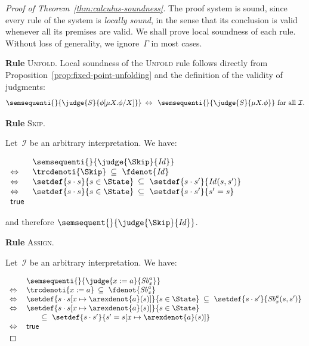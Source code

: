 \documentclass[a4paper,numberwithinsect]{lipics-v2021}
\begin{document}
\begin{proof}[Proof of Theorem~\ref{thm:calculus-soundness}]
  The proof system is sound, since every rule of the system is
  \emph{locally sound}, in the sense that its conclusion is valid
  whenever all its premises are valid.
  We shall prove local soundness of each rule.
  Without loss of generality, we ignore~$\Gamma$ in most cases.

  \iffalse
  \noindent\textbf{Rule} \textsc{Unfold}.
  Local soundness of the \textsc{Unfold} rule follows directly from
  Proposition~\ref{prop:fixed-point-unfolding} and the definition of
  the validity of judgments:
  \[
    \semsequenti{}{\judge{S}{\phi [\mu X. \phi / X]}}
    \>\Leftrightarrow\>\>
    \semsequenti{}{\judge{S}{\mu X. \phi}}\text{ for all }\mathcal{I}.
  \]

  \noindent\textbf{Rule} \textsc{Skip}.

  Let~$\mathcal{I}$ be an arbitrary interpretation.
  We have: %
  
  $
  \begin{array}{ll}
    & 
      \semsequenti{}{\judge{\Skip}{\mathit{Id}}} \\
    \Leftrightarrow\> & 
                        \trcdenoti{\Skip} \>\subseteq\
                        \fdenot{\mathit{Id}} \\
    \Leftrightarrow & 
                      \setdef{s \cdot s}{s \in \State} \>\subseteq\ 
                      \setdef{s \cdot s'}{\mathit{Id} (s, s')} \\
    \Leftrightarrow & 
                      \setdef{s \cdot s}{s \in \State} \>\subseteq\ 
                      \setdef{s \cdot s'}{s' = s} \\
    \mathsf{true}
  \end{array}
  $ 
  
  \noindent
  and therefore $ \semsequent{}{\judge{\Skip}{\mathit{Id}}} $.
  
  \noindent\textbf{Rule} \textsc{Assign}.
  
  Let~$\mathcal{I}$ be an arbitrary interpretation.
  We have: %

  $
  \begin{array}{ll}
    & 
      \semsequenti{}{\judge{x := a}{\mathit{Sb}^{a}_{x}}} \\
    \Leftrightarrow\> & 
                        \trcdenoti{x := a} \>\subseteq\
                        \fdenot{\mathit{Sb}^{a}_{x}} \\
    \Leftrightarrow & 
                      \setdef{s \cdot s[x \mapsto \arexdenot{a} (s)]}
                      {s \in \State} 
                      \>\subseteq\ 
                      \setdef{s \cdot s'}{\mathit{Sb}^{a}_{x} (s, s')} \\
    \Leftrightarrow & 
                      \setdef{s \cdot s[x \mapsto \arexdenot{a} (s)]}{s \in \State} \\
    & \qquad\subseteq\ 
      \setdef{s \cdot s'}{s' = s[x \mapsto \arexdenot{a} (s)]} \\
    \Leftrightarrow & 
                      \mathsf{true} 
  \end{array}
  $ 
    

\end{proof}
\end{document}
